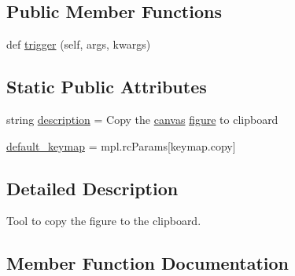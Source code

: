 \subsection*{Public Member Functions}
\begin{DoxyCompactItemize}
\item 
def \hyperlink{classmatplotlib_1_1backend__tools_1_1ToolCopyToClipboardBase_a905bf599db0b31af75a18e0752c24070}{trigger} (self, args, kwargs)
\end{DoxyCompactItemize}
\subsection*{Static Public Attributes}
\begin{DoxyCompactItemize}
\item 
string \hyperlink{classmatplotlib_1_1backend__tools_1_1ToolCopyToClipboardBase_a3aae6c2d73a3f969bc4612b82729d056}{description} = \textquotesingle{}Copy the \hyperlink{classmatplotlib_1_1backend__tools_1_1ToolBase_ac96bf482f1c26012fec3fd575e849170}{canvas} \hyperlink{classmatplotlib_1_1backend__tools_1_1ToolBase_af85e83d1db0787aa40d06837204651ee}{figure} to clipboard\textquotesingle{}
\item 
\hyperlink{classmatplotlib_1_1backend__tools_1_1ToolCopyToClipboardBase_a2dfa0319a3f27db11b2e4c433887ce89}{default\+\_\+keymap} = mpl.\+rc\+Params\mbox{[}\textquotesingle{}keymap.\+copy\textquotesingle{}\mbox{]}
\end{DoxyCompactItemize}


\subsection{Detailed Description}
\begin{DoxyVerb}Tool to copy the figure to the clipboard.\end{DoxyVerb}
 

\subsection{Member Function Documentation}
\mbox{\label{classmatplotlib_1_1backend__tools_1_1ToolCopyToClipboardBase_a905bf599db0b31af75a18e0752c24070}} 
